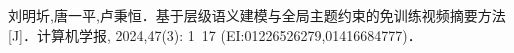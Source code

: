 \begin{achievelist}
    \item 刘明圻,唐一平,卢秉恒．基于层级语义建模与全局主题约束的免训练视频摘要方法[J]．计算机学报, 2024,47(3): 1~17 (EI:01226526279,01416684777)．
\end{achievelist}
